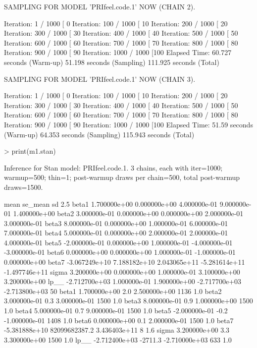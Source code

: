 \documentclass[12pt]{article}
\begin{document}
\begin{enumerate}
\begin{Schunk}
\begin{Soutput}
SAMPLING FOR MODEL 'PRIfeel.code.1' NOW (CHAIN 2).

Iteration:   1 / 1000 [  0%
Iteration: 100 / 1000 [ 10%
Iteration: 200 / 1000 [ 20%
Iteration: 300 / 1000 [ 30%
Iteration: 400 / 1000 [ 40%
Iteration: 500 / 1000 [ 50%
Iteration: 600 / 1000 [ 60%
Iteration: 700 / 1000 [ 70%
Iteration: 800 / 1000 [ 80%
Iteration: 900 / 1000 [ 90%
Iteration: 1000 / 1000 [100%
Elapsed Time: 60.727 seconds (Warm-up)
              51.198 seconds (Sampling)
              111.925 seconds (Total)

SAMPLING FOR MODEL 'PRIfeel.code.1' NOW (CHAIN 3).

Iteration:   1 / 1000 [  0%
Iteration: 100 / 1000 [ 10%
Iteration: 200 / 1000 [ 20%
Iteration: 300 / 1000 [ 30%
Iteration: 400 / 1000 [ 40%
Iteration: 500 / 1000 [ 50%
Iteration: 600 / 1000 [ 60%
Iteration: 700 / 1000 [ 70%
Iteration: 800 / 1000 [ 80%
Iteration: 900 / 1000 [ 90%
Iteration: 1000 / 1000 [100%
Elapsed Time: 51.59 seconds (Warm-up)
              64.353 seconds (Sampling)
              115.943 seconds (Total)
\end{Soutput}
\begin{Sinput}
> print(m1.stan)
\end{Sinput}
\begin{Soutput}
Inference for Stan model: PRIfeel.code.1.
3 chains, each with iter=1000; warmup=500; thin=1; 
post-warmup draws per chain=500, total post-warmup draws=1500.

               mean      se_mean           sd          2.5%
beta1  1.700000e+00 0.000000e+00 4.000000e-01  9.000000e-01  1.400000e+00
beta2  3.000000e-01 0.000000e+00 0.000000e+00  2.000000e-01  3.000000e-01
beta3  8.000000e-01 0.000000e+00 1.000000e-01  6.000000e-01  7.000000e-01
beta4  5.000000e-01 0.000000e+00 2.000000e-01  2.000000e-01  4.000000e-01
beta5 -2.000000e-01 0.000000e+00 1.000000e-01 -4.000000e-01 -3.000000e-01
beta6  0.000000e+00 0.000000e+00 1.000000e-01 -1.000000e-01  0.000000e+00
beta7 -3.067249e+10 7.188182e+10 2.043065e+11 -5.281614e+11 -1.497746e+11
sigma  3.200000e+00 0.000000e+00 1.000000e-01  3.100000e+00  3.200000e+00
lp__  -2.712700e+03 1.000000e-01 1.900000e+00 -2.717700e+03 -2.713800e+03
                50%
beta1  1.700000e+00           2.0  2.500000e+00  1136  1.0
beta2  3.000000e-01           0.3  3.000000e-01  1500  1.0
beta3  8.000000e-01           0.9  1.000000e+00  1500  1.0
beta4  5.000000e-01           0.7  9.000000e-01  1500  1.0
beta5 -2.000000e-01          -0.2 -1.000000e-01  1408  1.0
beta6  0.000000e+00           0.1  2.000000e-01  1500  1.0
beta7 -5.381888e+10 82099682387.2  3.436403e+11     8  1.6
sigma  3.200000e+00           3.3  3.300000e+00  1500  1.0
lp__  -2.712400e+03       -2711.3 -2.710000e+03   633  1.0


\end{Soutput}
\end{Schunk}
\end{enumerate}
\end{document}
